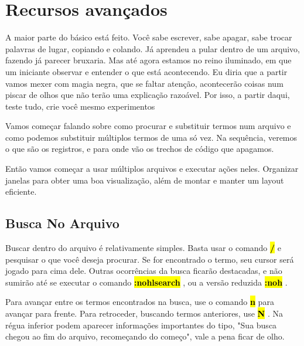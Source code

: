 \documentclass[a4paper, 12pt]{article}
\begin{document}





\newcommand{\vimcommand}[1]{%
    \sethlcolor{black}%
    \textbf{\textcolor{white}{\hl{#1}}}%
}
\newcommand{\vimkeys}[1]{%
    \sethlcolor{black}%
    \textbf{\textcolor{red}{\hl{#1}}}%
}






\section{Recursos avançados}
A maior parte do básico está feito.
Você sabe escrever, sabe apagar, sabe trocar palavras de lugar, copiando e colando.
Já aprendeu a pular dentro de um arquivo, fazendo já parecer bruxaria. Mas até agora
estamos no reino iluminado, em que um iniciante observar e entender o que está acontecendo.
Eu diria que a partir vamos mexer com magia negra, que se faltar atenção, acontecerão coisas num piscar de olhos
que não terão uma explicação razoável.
Por isso, a partir daqui, teste tudo, crie você mesmo experimentos

Vamos começar falando sobre como procurar e substituir termos num arquivo e
como podemos substituir múltiplos termos de uma só vez.
Na sequência, veremos o que são os registros, e para onde vão os trechos de código que apagamos.

Então vamos começar a usar múltiplos arquivos e executar ações neles.
Organizar janelas para obter uma boa visualização, além de montar e manter um layout eficiente.

\subsection{Busca No Arquivo}
Buscar dentro do arquivo é relativamente simples.
Basta usar o comando \vimcommand{/} e pesquisar o que você deseja procurar.
Se for encontrado o termo, seu cursor será jogado para cima dele.
Outras ocorrências da busca ficarão destacadas, e não sumirão até se executar o comando
\vimcommand{:nohlsearch}, ou a versão reduzida \vimcommand{:noh}. 

Para avançar entre os termos encontrados na busca, use o comando \vimcommand{n} para avançar para frente.
Para retroceder, buscando termos anteriores, use \vimcommand{N}.
Na régua inferior podem aparecer informações importantes do tipo, "Sua busca chegou ao fim do arquivo, recomeçando do começo",
vale a pena ficar de olho.
\end{document}
